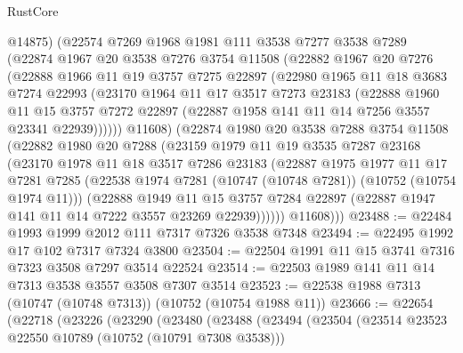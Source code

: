\begin{lexlean}{RustCore}
\begin{coremodule}
        @14875)
      (@22574
        @7269
        @1968
        @1981
        @111
        @3538
        @7277
        @3538
        @7289
        (@22874
          @1967
          @20
          @3538
          @7276
          @3754
          @11508
          (@22882
            @1967
            @20
            @7276
            (@22888
              @1966
              @11
              @19
              @3757
              @7275
              @22897
              (@22980
                @1965
                @11
                @18
                @3683
                @7274
                @22993
                (@23170
                  @1964
                  @11
                  @17
                  @3517
                  @7273
                  @23183
                  (@22888
                    @1960
                    @11
                    @15
                    @3757
                    @7272
                    @22897
                    (@22887 @1958 @141 @11 @14 @7256 @3557 @23341 @22939))))))
          @11608)
        (@22874
          @1980
          @20
          @3538
          @7288
          @3754
          @11508
          (@22882
            @1980
            @20
            @7288
            (@23159
              @1979
              @11
              @19
              @3535
              @7287
              @23168
              (@23170
                @1978
                @11
                @18
                @3517
                @7286
                @23183
                (@22887
                  @1975
                  @1977
                  @11
                  @17
                  @7281
                  @7285
                  (@22538 @1974 @7281 (@10747 (@10748 @7281)) (@10752 (@10754 @1974 @11)))
                  (@22888
                    @1949
                    @11
                    @15
                    @3757
                    @7284
                    @22897
                    (@22887 @1947 @141 @11 @14 @7222 @3557 @23269 @22939))))))
          @11608)))
@23488 := @22484 @1993 @1999 @2012 @111 @7317 @7326 @3538 @7348
@23494 := @22495 @1992 @17 @102 @7317 @7324 @3800
@23504 := @22504 @1991 @11 @15 @3741 @7316 @7323 @3508 @7297 @3514 @22524
@23514 := @22503 @1989 @141 @11 @14 @7313 @3538 @3557 @3508 @7307 @3514
@23523 := @22538 @1988 @7313 (@10747 (@10748 @7313)) (@10752 (@10754 @1988 @11))
@23666 := @22654
    (@22718
      (@23226
        (@23290
          (@23480
            (@23488
              (@23494
                (@23504
                  (@23514 @23523 @22550 @10789 (@10752 (@10791 @7308 @3538)))

\end{coremodule}
\end{lexlean}
